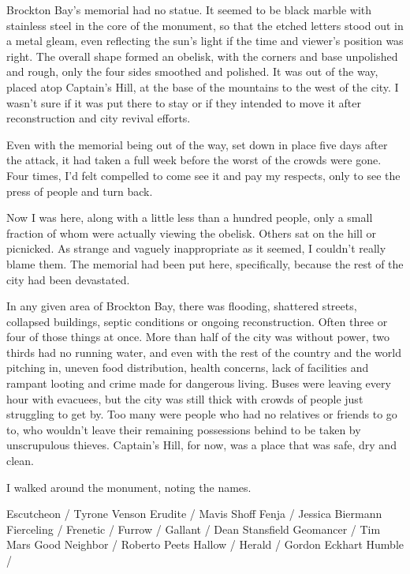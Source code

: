 Brockton Bay's memorial had no statue.  It seemed to be black marble with stainless steel in the core of the monument, so that the etched letters stood out in a metal gleam, even reflecting the sun's light if the time and viewer's position was right.  The overall shape formed an obelisk, with the corners and base unpolished and rough, only the four sides smoothed and polished.  It was out of the way, placed atop Captain's Hill, at the base of the mountains to the west of the city.  I wasn't sure if it was put there to stay or if they intended to move it after reconstruction and city revival efforts.



Even with the memorial being out of the way, set down in place five days after the attack, it had taken a full week before the worst of the crowds were gone.  Four times, I'd felt compelled to come see it and pay my respects, only to see the press of people and turn back.



Now I was here, along with a little less than a hundred people, only a small fraction of whom were actually viewing the obelisk.  Others sat on the hill or picnicked.  As strange and vaguely inappropriate as it seemed, I couldn't really blame them.  The memorial had been put here, specifically, because the rest of the city had been devastated.



In any given area of Brockton Bay, there was flooding, shattered streets, collapsed buildings, septic conditions or ongoing reconstruction.  Often three or four of those things at once.  More than half of the city was without power, two thirds had no running water, and even with the rest of the country and the world pitching in, uneven food distribution, health concerns, lack of facilities and rampant looting and crime made for dangerous living.  Buses were leaving every hour with evacuees, but the city was still thick with crowds of people just struggling to get by.  Too many were people who had no relatives or friends to go to, who wouldn't leave their remaining possessions behind to be taken by unscrupulous thieves.  Captain's Hill, for now, was a place that was safe, dry and clean.



I walked around the monument, noting the names.



Escutcheon / Tyrone Venson
Erudite / Mavis Shoff
Fenja / Jessica Biermann
Fierceling /
Frenetic /
Furrow /
Gallant / Dean Stansfield
Geomancer / Tim Mars
Good Neighbor / Roberto Peets
Hallow /
Herald / Gordon Eckhart
Humble /



